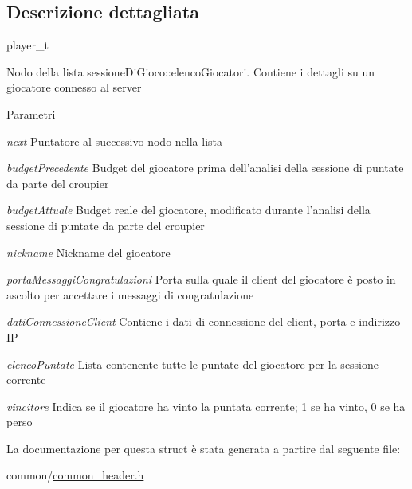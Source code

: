 \subsection{Descrizione dettagliata}
player\_\-t

Nodo della lista sessioneDiGioco::elencoGiocatori. Contiene i dettagli su un giocatore connesso al server 
\begin{DoxyParams}{Parametri}
\item[{\em next}]Puntatore al successivo nodo nella lista \item[{\em budgetPrecedente}]Budget del giocatore prima dell'analisi della sessione di puntate da parte del croupier \item[{\em budgetAttuale}]Budget reale del giocatore, modificato durante l'analisi della sessione di puntate da parte del croupier \item[{\em nickname}]Nickname del giocatore \item[{\em portaMessaggiCongratulazioni}]Porta sulla quale il client del giocatore è posto in ascolto per accettare i messaggi di congratulazione \item[{\em datiConnessioneClient}]Contiene i dati di connessione del client, porta e indirizzo IP \item[{\em elencoPuntate}]Lista contenente tutte le puntate del giocatore per la sessione corrente \item[{\em vincitore}]Indica se il giocatore ha vinto la puntata corrente; 1 se ha vinto, 0 se ha perso \end{DoxyParams}


La documentazione per questa struct è stata generata a partire dal seguente file:\begin{DoxyCompactItemize}
\item 
common/\hyperlink{common__header_8h}{common\_\-header.h}\end{DoxyCompactItemize}
